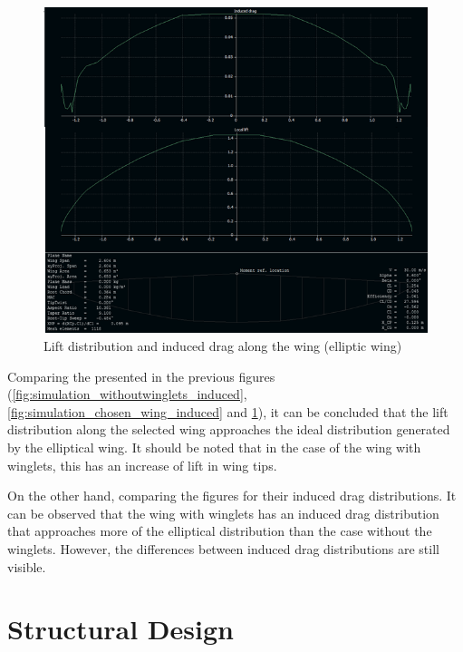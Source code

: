 \documentclass[english,fira]{ist-report}
\begin{document}
\begin{figure}[!ht]
    \centering
    	\includegraphics[width = 0.55\linewidth]{graphics/aero_simulation_elliptic(induced).png}
    \caption{Lift distribution and induced drag along the wing (elliptic wing)}
    \label{fig:simulation_elliptic_wing_induced}
\end{figure}

Comparing the presented in the previous figures (\ref{fig:simulation_withoutwinglets_induced}, \ref{fig:simulation_chosen_wing_induced} and \ref{fig:simulation_elliptic_wing_induced}), it can be concluded that the lift distribution along the selected wing approaches the ideal distribution generated by the elliptical wing. It should be noted that in the case of the wing with winglets, this has an increase of lift in wing tips. 

On the other hand, comparing the figures for their induced drag distributions. It can be observed that the wing with winglets has an induced drag distribution that approaches more of the elliptical distribution than the case without the winglets. However, the differences between induced drag distributions are still visible.





\chapter{Structural Design}
\end{document}
